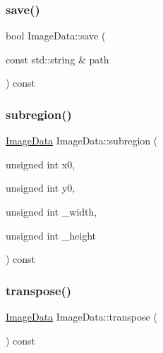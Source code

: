 \subsubsection{\texorpdfstring{save()}{save()}}
{\footnotesize\ttfamily bool Image\+Data\+::save (\begin{DoxyParamCaption}\item[{const std\+::string \&}]{path }\end{DoxyParamCaption}) const}

\mbox{\label{structpixel_1_1graphics_1_1_image_data_a906eb1e4aa34ab928cfe5500a5ed70e4}} 
\subsubsection{\texorpdfstring{subregion()}{subregion()}}
{\footnotesize\ttfamily \hyperlink{structpixel_1_1graphics_1_1_image_data}{Image\+Data} Image\+Data\+::subregion (\begin{DoxyParamCaption}\item[{unsigned int}]{x0,  }\item[{unsigned int}]{y0,  }\item[{unsigned int}]{\+\_\+width,  }\item[{unsigned int}]{\+\_\+height }\end{DoxyParamCaption}) const}

\mbox{\label{structpixel_1_1graphics_1_1_image_data_aaed4255fc7c7edc0282ce58c111e27ed}} 
\subsubsection{\texorpdfstring{transpose()}{transpose()}}
{\footnotesize\ttfamily \hyperlink{structpixel_1_1graphics_1_1_image_data}{Image\+Data} Image\+Data\+::transpose (\begin{DoxyParamCaption}{ }\end{DoxyParamCaption}) const}



